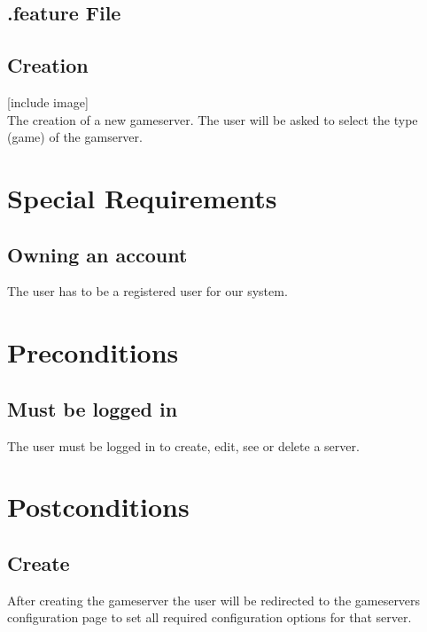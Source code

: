 \documentclass[a4paper,12pt,chapterprefix=false,bibliography=totoc,listof=totoc,book]{scrreprt}
\begin{document}
\section{.feature File}



\section{Creation}
[include image]\\
The creation of a new gameserver. The user will be asked to select the type (game) of the gamserver.

\chapter{Special Requirements}

\section{Owning an account}
The user has to be a registered user for our system.

\chapter{Preconditions}
\section{Must be logged in}
The user must be logged in to create, edit, see or delete a server.

\chapter{Postconditions}

\section{Create}
After creating the gameserver the user will be redirected to the gameservers configuration page to set all required configuration options for that server.
\end{document}
